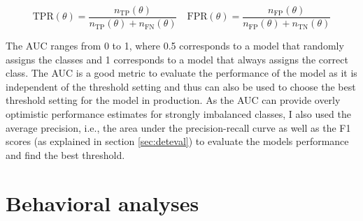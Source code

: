 \begin{equation}
  \text{TPR}(\theta) = \frac{n_{\text{TP}}(\theta)}{n_{\text{TP}}(\theta) + n_{\text{FN}}(\theta)} \quad \text{FPR}(\theta) = \frac{n_{\text{FP}}(\theta)}{n_{\text{FP}}(\theta) + n_{\text{TN}}(\theta)} \label{eq:roc}
\label{eq:aucroc}
\end{equation}

The AUC ranges from 0 to 1, where 0.5 corresponds to a model that randomly
assigns the classes and 1 corresponds to a model that always assigns the
correct class. The AUC is a good metric to evaluate the performance of the
model as it is independent of the threshold setting and thus can also be used
to choose the best threshold setting for the model in production. As the AUC
can provide overly optimistic performance estimates for strongly imbalanced
classes, I also used the average precision, i.e., the area under the
precision-recall curve as well as the F1 scores (as explained in section
\ref{sec:deteval}) to evaluate the models performance and find the best
threshold.

\section{Behavioral analyses}

